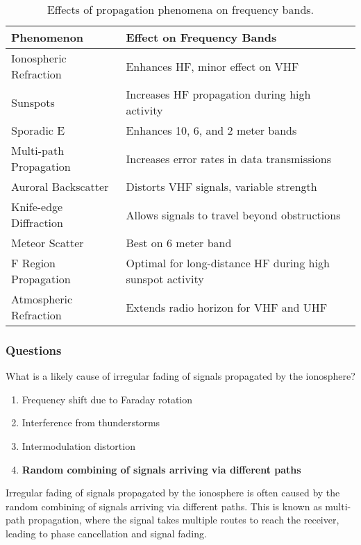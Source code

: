 \begin{table}[h]
    \centering
    \caption{Effects of propagation phenomena on frequency bands.}
    \label{tab:propagation-effects}
    \begin{tabular}{|l|l|}
        \hline
        \textbf{Phenomenon} & \textbf{Effect on Frequency Bands} \\
        \hline
        Ionospheric Refraction & Enhances HF, minor effect on VHF \\
        Sunspots & Increases HF propagation during high activity \\
        Sporadic E & Enhances 10, 6, and 2 meter bands \\
        Multi-path Propagation & Increases error rates in data transmissions \\
        Auroral Backscatter & Distorts VHF signals, variable strength \\
        Knife-edge Diffraction & Allows signals to travel beyond obstructions \\
        Meteor Scatter & Best on 6 meter band \\
        F Region Propagation & Optimal for long-distance HF during high sunspot activity \\
        Atmospheric Refraction & Extends radio horizon for VHF and UHF \\
        \hline
    \end{tabular}
\end{table}

\subsubsection*{Questions}

\begin{tcolorbox}[colback=gray!10!white,colframe=black!75!black,title={T3A08}]
    What is a likely cause of irregular fading of signals propagated by the ionosphere?
    \begin{enumerate}[label=\Alph*),noitemsep]
        \item Frequency shift due to Faraday rotation
        \item Interference from thunderstorms
        \item Intermodulation distortion
        \item \textbf{Random combining of signals arriving via different paths}
    \end{enumerate}
\end{tcolorbox}
Irregular fading of signals propagated by the ionosphere is often caused by the random combining of signals arriving via different paths. This is known as multi-path propagation, where the signal takes multiple routes to reach the receiver, leading to phase cancellation and signal fading.


